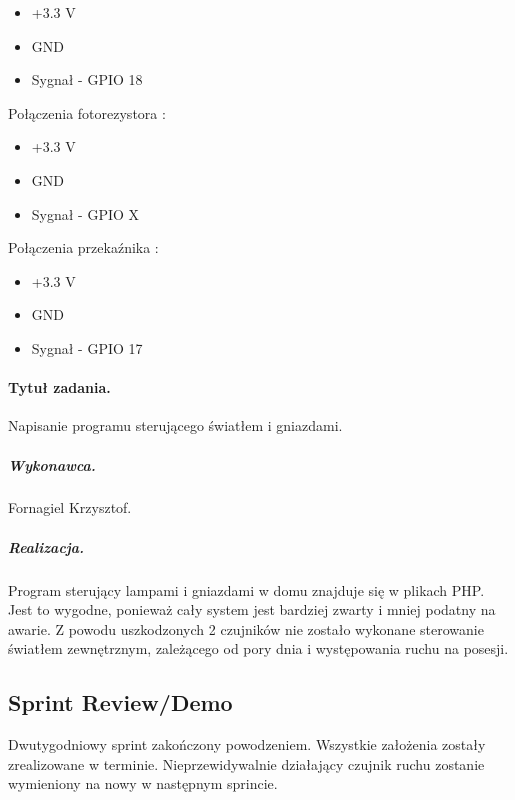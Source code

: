 	\begin{itemize}
		\item +3.3 V
		\item GND
		\item Sygnał - GPIO 18
	\end{itemize}
	Połączenia fotorezystora :
	\begin{itemize}
		\item +3.3 V
		\item GND
		\item Sygnał - GPIO X
	\end{itemize}
	Połączenia przekaźnika : 
	\begin{itemize}
		\item +3.3 V
		\item GND
		\item Sygnał - GPIO 17
	\end{itemize}
	
	\paragraph{Tytuł zadania.} Napisanie programu sterującego światłem i gniazdami.
	\subparagraph{Wykonawca.} Fornagiel Krzysztof.
	\subparagraph{Realizacja.} Program sterujący lampami i gniazdami w domu znajduje się w plikach PHP. Jest to wygodne, ponieważ cały system jest bardziej zwarty i mniej podatny na awarie. Z powodu uszkodzonych 2 czujników nie zostało wykonane sterowanie światłem zewnętrznym, zależącego od pory dnia i występowania ruchu na posesji.

	
	\subsection{Sprint Review/Demo}
	Dwutygodniowy sprint zakończony powodzeniem. Wszystkie założenia zostały zrealizowane w terminie. Nieprzewidywalnie działający czujnik ruchu zostanie wymieniony na nowy w następnym sprincie.
	